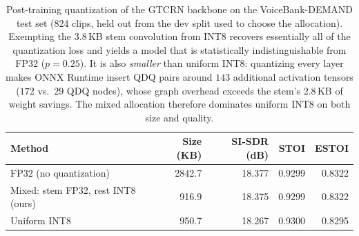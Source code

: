 \begin{table}[t]
\centering
\caption{Post-training quantization of the GTCRN backbone on the VoiceBank-DEMAND test set (824 clips, held out from the dev split used to choose the allocation). Exempting the 3.8\,KB stem convolution from INT8 recovers essentially all of the quantization loss and yields a model that is statistically indistinguishable from FP32 ($p=0.25$). It is also \emph{smaller} than uniform INT8: quantizing every layer makes ONNX Runtime insert QDQ pairs around $143$ additional activation tensors ($172$ vs.\ $29$ QDQ nodes), whose graph overhead exceeds the stem's $2.8$\,KB of weight savings. The mixed allocation therefore dominates uniform INT8 on both size and quality.}
\label{tab:mixed_precision}
\begin{tabular}{lrrrr}
\toprule
Method & Size (KB) & SI-SDR (dB) & STOI & ESTOI \\
\midrule
FP32 (no quantization) & 2842.7 & 18.377 & 0.9299 & 0.8322 \\
Mixed: stem FP32, rest INT8 (ours) & 916.9 & 18.375 & 0.9299 & 0.8322 \\
Uniform INT8 & 950.7 & 18.267 & 0.9300 & 0.8295 \\
\bottomrule
\end{tabular}
\end{table}